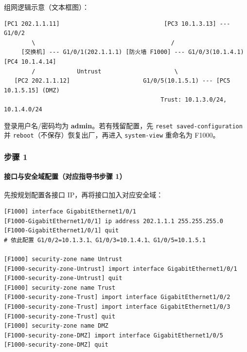 \documentclass[12pt,a4paper]{article}
\begin{document}
\noindent 组网逻辑示意（文本框图）：
\begin{lstlisting}[basicstyle=\ttfamily\scriptsize]
   [PC1 202.1.1.11]                              [PC3 10.1.3.13] --- G1/0/2
        \                                       /
     [交换机] --- G1/0/1(202.1.1.1) [防火墙 F1000] --- G1/0/3(10.1.4.1) [PC4 10.1.4.14]
        /            Untrust                     \
   [PC2 202.1.1.12]                     G1/0/5(10.1.5.1) --- [PC5 10.1.5.15] (DMZ)
                                             Trust: 10.1.3.0/24, 10.1.4.0/24
\end{lstlisting}

登录用户名/密码均为 \textbf{admin}。若有残留配置，先 \texttt{reset saved-configuration} 并 \texttt{reboot}（不保存）恢复出厂，再进入 \texttt{system-view} 重命名为 F1000。

\subsubsection*{步骤 1}
\paragraph{接口与安全域配置（对应指导书步骤 1）}
先按规划配置各接口 IP，再将接口加入对应安全域：
\begin{lstlisting}
[F1000] interface GigabitEthernet1/0/1
[F1000-GigabitEthernet1/0/1] ip address 202.1.1.1 255.255.255.0
[F1000-GigabitEthernet1/0/1] quit
# 依此配置 G1/0/2=10.1.3.1、G1/0/3=10.1.4.1、G1/0/5=10.1.5.1

[F1000] security-zone name Untrust
[F1000-security-zone-Untrust] import interface GigabitEthernet1/0/1
[F1000-security-zone-Untrust] quit
[F1000] security-zone name Trust
[F1000-security-zone-Trust] import interface GigabitEthernet1/0/2
[F1000-security-zone-Trust] import interface GigabitEthernet1/0/3
[F1000-security-zone-Trust] quit
[F1000] security-zone name DMZ
[F1000-security-zone-DMZ] import interface GigabitEthernet1/0/5
[F1000-security-zone-DMZ] quit
\end{lstlisting}
\end{document}
